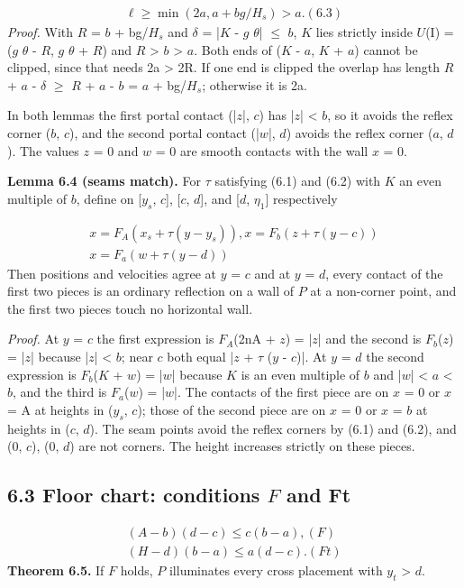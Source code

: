 \documentclass[11pt]{article}
\begin{document}
\begin{gather*}
\ell \ge  \min(2a, a + bg/H_{s}) > a.                                  (6.3)
\end{gather*}
\emph{Proof.} With \(R\) = \(b\) + bg/\(H_{s}\) and \(\delta\) = |\(K\) - \(g\) \(\theta\)| \(\le\) \(b\), \(K\) lies strictly inside \(U\)(I) = (\(g\) \(\theta\) - \(R\), \(g\) \(\theta\) + \(R\)) and \(R\) > \(b\) > \(a\). Both ends of (\(K\) - \(a\), \(K\) + \(a\)) cannot be clipped, since that needs 2a > 2R. If one end is clipped the overlap has length \(R\) + \(a\) - \(\delta\) \(\ge\) \(R\) + \(a\) - \(b\) = \(a\) + bg/\(H_{s}\); otherwise it is 2a.

In both lemmas the first portal contact (|\(z\)|, \(c\)) has |\(z\)| < \(b\), so it avoids the reflex corner (\(b\), \(c\)), and the second portal contact (|\(w\)|, \(d\)) avoids the reflex corner (\(a\), \(d\)). The values \(z\) = 0 and \(w\) = 0 are smooth contacts with the wall \(x\) = 0.

\textbf{Lemma 6.4 (seams match).} For \(\tau\) satisfying (6.1) and (6.2) with \(K\) an even multiple of \(b\), define on [\(y_{s}\), \(c\)], [\(c\), \(d\)], and [\(d\), \(\eta_{1}\)] respectively

\begin{gather*}
x = F_{A}(x_{s} + \tau (y - y_{s})),   x = F_{b}(z + \tau (y - c)) \\
x = F_{a}(w + \tau (y - d))
\end{gather*}
Then positions and velocities agree at \(y\) = \(c\) and at \(y\) = \(d\), every contact of the first two pieces is an ordinary reflection on a wall of \(P\) at a non-corner point, and the first two pieces touch no horizontal wall.

\emph{Proof.} At \(y\) = \(c\) the first expression is \(F_{A}\)(2nA + \(z\)) = |\(z\)| and the second is \(F_{b}\)(\(z\)) = |\(z\)| because |\(z\)| < \(b\); near \(c\) both equal |\(z\) + \(\tau\) (\(y\) - \(c\))|. At \(y\) = \(d\) the second expression is \(F_{b}\)(\(K\) + \(w\)) = |\(w\)| because \(K\) is an even multiple of \(b\) and |\(w\)| < \(a\) < \(b\), and the third is \(F_{a}\)(\(w\)) = |\(w\)|. The contacts of the first piece are on \(x\) = 0 or \(x\) = A at heights in (\(y_{s}\), \(c\)); those of the second piece are on \(x\) = 0 or \(x\) = \(b\) at heights in (\(c\), \(d\)). The seam points avoid the reflex corners by (6.1) and (6.2), and (0, \(c\)), (0, \(d\)) are not corners. The height increases strictly on these pieces.

\subsection*{6.3 Floor chart: conditions \(F\) and Ft}
\begin{gather*}
(A - b)(d - c) \le  c(b - a),                                       (F) \\
(H - d)(b - a) \le  a(d - c).                                       (Ft)
\end{gather*}
\textbf{Theorem 6.5.} If \(F\) holds, \(P\) illuminates every cross placement with \(y_{t}\) > \(d\).
\end{document}

